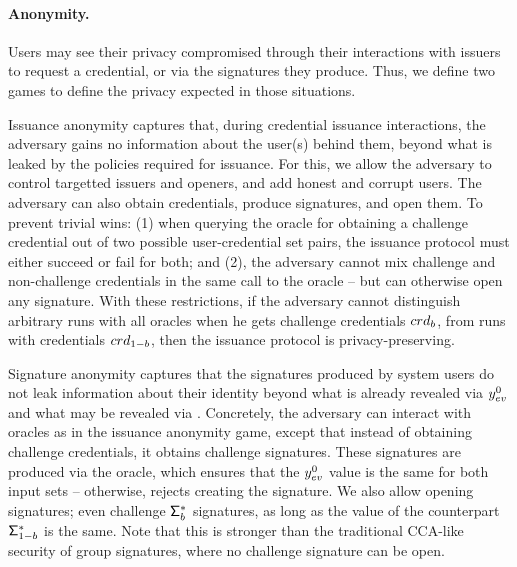 
\paragraph{Anonymity.} %
Users may see their privacy compromised through their interactions with issuers
to request a credential, or via the signatures they produce. Thus, we define two
games to define the privacy expected in those situations.

Issuance anonymity captures that, during credential issuance
interactions, the adversary gains no information about the user(s) behind them,
beyond what is leaked by the policies required for issuance. For this, we allow
the adversary to control targetted issuers and openers, and add honest and
corrupt users. The adversary can also obtain credentials, produce signatures,
and open them. To prevent trivial wins: (1) when querying the oracle for
obtaining a challenge credential out of two possible user-credential set pairs,
the issuance protocol must either succeed or fail for both; and (2), the
adversary cannot mix challenge and non-challenge credentials in the same call to
the \SIGN oracle -- but can otherwise open any signature. With these
restrictions, if the adversary cannot distinguish arbitrary runs with all
oracles when he gets challenge credentials $crd_b$, from runs with credentials
$crd_{1-b}$, then the issuance protocol is privacy-preserving.

Signature anonymity captures that the signatures produced by system users do not
leak information about their identity beyond what is already revealed via
$y_{ev}^0$ and what may be revealed via \yinsp. Concretely, the adversary can
interact with oracles as in the issuance anonymity game, except that instead of
obtaining challenge credentials, it obtains challenge signatures. These
signatures are produced via the \CHALb oracle, which ensures that the $y_{ev}^0$
value is the same for both input sets -- otherwise, rejects creating the
signature. We also allow opening signatures; even challenge $\mathsf{\Sigma}^*_b$
signatures, as long as the \yinsp value of the counterpart $\mathsf{\Sigma}^*_{1-b}$ is the
same. Note that this is stronger than the traditional CCA-like security of group
signatures, where no challenge signature can be open.

